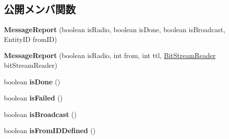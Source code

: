 \subsection*{公開メンバ関数}
\begin{DoxyCompactItemize}
\item 
\hypertarget{classadf_1_1agent_1_1communication_1_1standard_1_1bundle_1_1centralized_1_1MessageReport_a1b64614f515d5fe01aa3750c8bdbf9b0}{}\label{classadf_1_1agent_1_1communication_1_1standard_1_1bundle_1_1centralized_1_1MessageReport_a1b64614f515d5fe01aa3750c8bdbf9b0} 
{\bfseries Message\+Report} (boolean is\+Radio, boolean is\+Done, boolean is\+Broadcast, Entity\+ID from\+ID)
\item 
\hypertarget{classadf_1_1agent_1_1communication_1_1standard_1_1bundle_1_1centralized_1_1MessageReport_af126fb1945ab9718067b55d0dd50658b}{}\label{classadf_1_1agent_1_1communication_1_1standard_1_1bundle_1_1centralized_1_1MessageReport_af126fb1945ab9718067b55d0dd50658b} 
{\bfseries Message\+Report} (boolean is\+Radio, int from, int ttl, \hyperlink{classadf_1_1component_1_1communication_1_1util_1_1BitStreamReader}{Bit\+Stream\+Reader} bit\+Stream\+Reader)
\item 
\hypertarget{classadf_1_1agent_1_1communication_1_1standard_1_1bundle_1_1centralized_1_1MessageReport_aef3d878f86d949beeb4b9c5450f6cf9b}{}\label{classadf_1_1agent_1_1communication_1_1standard_1_1bundle_1_1centralized_1_1MessageReport_aef3d878f86d949beeb4b9c5450f6cf9b} 
boolean {\bfseries is\+Done} ()
\item 
\hypertarget{classadf_1_1agent_1_1communication_1_1standard_1_1bundle_1_1centralized_1_1MessageReport_a6a56947c3c224a169464f5158595eabe}{}\label{classadf_1_1agent_1_1communication_1_1standard_1_1bundle_1_1centralized_1_1MessageReport_a6a56947c3c224a169464f5158595eabe} 
boolean {\bfseries is\+Failed} ()
\item 
\hypertarget{classadf_1_1agent_1_1communication_1_1standard_1_1bundle_1_1centralized_1_1MessageReport_aec30df4b7376f6e2d19ac6c52cec660c}{}\label{classadf_1_1agent_1_1communication_1_1standard_1_1bundle_1_1centralized_1_1MessageReport_aec30df4b7376f6e2d19ac6c52cec660c} 
boolean {\bfseries is\+Broadcast} ()
\item 
\hypertarget{classadf_1_1agent_1_1communication_1_1standard_1_1bundle_1_1centralized_1_1MessageReport_ad56cac1b5661d772a4193f8ac5543b58}{}\label{classadf_1_1agent_1_1communication_1_1standard_1_1bundle_1_1centralized_1_1MessageReport_ad56cac1b5661d772a4193f8ac5543b58} 
boolean {\bfseries is\+From\+I\+D\+Defined} ()

\end{DoxyCompactItemize}
